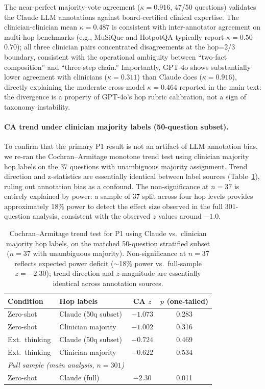 \documentclass{article}
\begin{document}
The near-perfect majority-vote agreement ($\kappa = 0.916$, 47/50 questions)
validates the Claude LLM annotations against board-certified clinical expertise.
The clinician-clinician mean $\kappa = 0.487$ is consistent with inter-annotator
agreement on multi-hop benchmarks (e.g., MuSiQue and HotpotQA typically report
$\kappa = 0.50$--$0.70$); all three clinician pairs concentrated disagreements at
the hop=2/3 boundary, consistent with the operational ambiguity between
``two-fact composition'' and ``three-step chain.'' Importantly, GPT-4o shows
substantially lower agreement with clinicians ($\kappa = 0.311$) than Claude does
($\kappa = 0.916$), directly explaining the moderate cross-model $\kappa = 0.464$
reported in the main text: the divergence is a property of GPT-4o's hop rubric
calibration, not a sign of taxonomy instability.

\paragraph{CA trend under clinician majority labels (50-question subset).}
To confirm that the primary P1 result is not an artifact of LLM annotation bias,
we re-ran the Cochran--Armitage monotone trend test using clinician majority hop
labels on the 37 questions with unambiguous majority assignment.
Trend direction and z-statistics are essentially identical between label sources
(Table~\ref{tab:clinician_ca}), ruling out annotation bias as a confound.
The non-significance at $n = 37$ is entirely explained by power: a sample of
37 split across four hop levels provides approximately 18\% power to detect
the effect size observed in the full 301-question analysis, consistent with the
observed $z$ values around $-1.0$.

\begin{table}[h]
\centering
\caption{Cochran--Armitage trend test for P1 using Claude vs.\ clinician majority
hop labels, on the matched 50-question stratified subset ($n = 37$ with
unambiguous majority). Non-significance at $n = 37$ reflects expected power
deficit ($\sim$18\% power vs.\ full-sample $z = -2.30$); trend direction and
$z$-magnitude are essentially identical across annotation sources.}
\label{tab:clinician_ca}
\small
\begin{tabular}{llcc}
\toprule
\textbf{Condition} & \textbf{Hop labels} & \textbf{CA $z$} & \textbf{$p$ (one-tailed)} \\
\midrule
Zero-shot    & Claude (50q subset)    & $-1.073$ & 0.283 \\
Zero-shot    & Clinician majority     & $-1.002$ & 0.316 \\
Ext.\ thinking & Claude (50q subset) & $-0.724$ & 0.469 \\
Ext.\ thinking & Clinician majority   & $-0.622$ & 0.534 \\
\midrule
\multicolumn{2}{l}{\textit{Full sample (main analysis, $n = 301$)}} & & \\
Zero-shot    & Claude (full)          & $-2.30$ & 0.011 \\
\bottomrule
\end{tabular}
\end{table}
\end{document}
